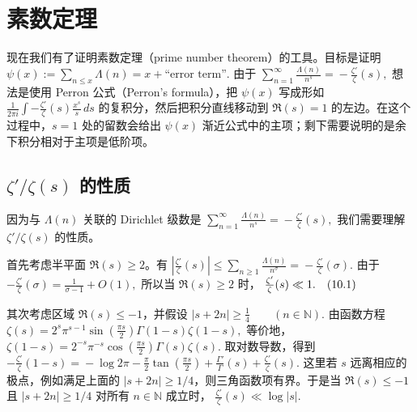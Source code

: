 \chapter{素数定理}
\label{chap:prime-number-theorem}

现在我们有了证明素数定理（prime number theorem）的工具。目标是证明
\(\textstyle \psi(x) :=\allowbreak{} \sum_{n\leq\allowbreak{} x}\Lambda(n) =\allowbreak{} x+\allowbreak{}\text{``error term''}.\)
由于
\(\textstyle \sum_{n=\allowbreak{}1}^{\infty}\frac{\Lambda(n)}{n^s} =\allowbreak{} -\frac{\zeta'}{\zeta}(s),\allowbreak{}\)
想法是使用 Perron 公式（Perron's formula），把 $\psi(x)$ 写成形如
\(\textstyle \frac{1}{2\pi i} \int -\frac{\zeta'}{\zeta}(s)\frac{x^s}{s}\,ds\)
的复积分，然后把积分直线移动到 $\Re(s)=1$ 的左边。在这个过程中，$s=1$ 处的留数会给出 $\psi(x)$ 渐近公式中的主项；剩下需要说明的是余下积分相对于主项是低阶项。

\section{\texorpdfstring{\(\zeta'/\zeta(s)\)}{zeta'/zeta(s)} 的性质}

因为与 $\Lambda(n)$ 关联的 Dirichlet 级数是
\(\textstyle \sum_{n=\allowbreak{}1}^{\infty}\frac{\Lambda(n)}{n^s} =\allowbreak{} -\frac{\zeta'}{\zeta}(s),\allowbreak{}\)
我们需要理解 $\zeta'/\zeta(s)$ 的性质。

首先考虑半平面 $\Re(s)\geq 2$。有
\(\textstyle \left|\frac{\zeta'}{\zeta}(s)\right| \leq\allowbreak{} \sum_{n\geq1}\frac{\Lambda(n)}{n^\sigma} =\allowbreak{} -\frac{\zeta'}{\zeta}(\sigma).\)
由于
\(\textstyle -\frac{\zeta'}{\zeta}(\sigma) =\allowbreak{} \frac1{\sigma-1}+\allowbreak{}O(1),\allowbreak{}\)
所以当 $\Re(s)\geq 2$ 时，
\(\textstyle \frac{\zeta'}{\zeta}(s)\ll\allowbreak{} 1. \quad\textup{(10.1)}\)

其次考虑区域 $\Re(s)\leq -1$，并假设
\(\textstyle |s+\allowbreak{}2n|\geq\allowbreak{} \frac14 \qquad (n\in\mathbb N).\)
由函数方程
\(\textstyle \zeta(s) =\allowbreak{} 2^s\pi^{s-1}\sin\left(\frac{\pi s}{2}\right)\Gamma(1-s)\zeta(1-s),\allowbreak{}\)
等价地，
\(\textstyle \zeta(1-s) =\allowbreak{} 2^{-s}\pi^{-s}\cos\left(\frac{\pi s}{2}\right)\Gamma(s)\zeta(s).\)
取对数导数，得到
\(\textstyle -\frac{\zeta'}{\zeta}(1-s) =\allowbreak{} -\log 2\pi -\frac{\pi}{2}\tan\left(\frac{\pi s}{2}\right) +\allowbreak{}\frac{\Gamma'}{\Gamma}(s) +\allowbreak{}\frac{\zeta'}{\zeta}(s).\)
这里若 $s$ 远离相应的极点，例如满足上面的 $|s+2n|\geq 1/4$，则三角函数项有界。于是当 $\Re(s)\leq -1$ 且
$|s+2n|\geq 1/4$ 对所有 $n\in\mathbb N$ 成立时，
\(\textstyle \frac{\zeta'}{\zeta}(s)\ll\allowbreak{} \log |s|.\)

